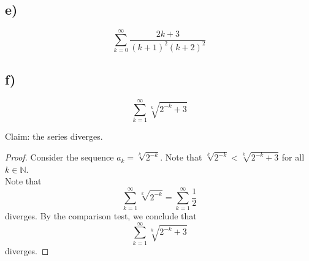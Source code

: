 \documentclass{article}
\newcommand{\N}{\mathbb{N}}
\theoremstyle{mytheoremstyle}
\theoremstyle{mytheoremstyle}
\theoremstyle{myproblemstyle}
\begin{document}
    \subsection{e)}
    \begin{problem}
        $$\sum_{k=0}^\infty \frac{2k+3}{(k+1)^2(k+2)^2}$$
    \end{problem}

    \subsection{f)}
    \begin{problem}
        $$\sum_{k=1}^\infty \sqrt[k]{2^{-k}+3}$$
    \end{problem}
    Claim: the series diverges.
    \begin{proof}[Proof]
        Consider the sequence $a_k = \sqrt[k]{2^{-k}}.$
        Note that $\sqrt[k]{2^{-k}} < \sqrt[k]{2^{-k}+3}$ for all $k \in \N$. \\
        Note that $$\sum_{k=1}^\infty \sqrt[k]{2^{-k}} = \sum_{k=1}^\infty \frac{1}{2}$$ diverges.
        By the comparison test, we conclude that
        $$\sum_{k=1}^\infty \sqrt[k]{2^{-k}+3}$$ diverges.
    \end{proof}
\end{document}
